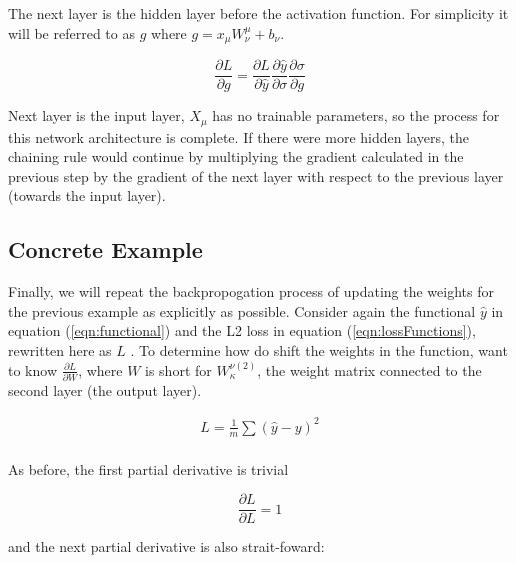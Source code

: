 \noindent The next layer is the hidden layer before the activation function. For simplicity it will be referred to as $ g $ where $ g = x_\mu W_\nu ^\mu + b_\nu $.  

\begin{equation}
    \frac{\partial L}{\partial g} = \frac{\partial L}{\partial \hat{y}} \frac{\partial \hat{y}}{\partial \sigma} \frac{\partial \sigma}{\partial g}
\end{equation}


\noindent Next layer is the input layer, $ X_\mu $ has no trainable parameters, so the process for this network architecture is complete. If there were more hidden layers, the chaining rule would continue by multiplying the gradient calculated in the previous step by the gradient of the next layer with respect to the previous layer (towards the input layer). 


\subsection{Concrete Example}

Finally, we will repeat the backpropogation process of updating the weights for the previous example as explicitly as possible. Consider again the functional $ \hat{y} $ in equation (\ref{eqn:functional}) and the L2 loss in equation (\ref{eqn:lossFunctions}), rewritten here as $ L $ . To determine how do shift the weights in the function, want to know $\frac{\partial L}{\partial W}$, where $ W  $ is short for $ W_\kappa ^{\nu (2)} $, the weight matrix connected to the second layer (the output layer). 

\begin{align}
L = \frac{1}{m}\sum(\hat{y} - y)^2 \\
\end{align}

\noindent As before, the first partial derivative is trivial

\begin{equation}
    \frac{\partial L}{\partial L} = 1
\end{equation}

and the next partial derivative is also strait-foward:

